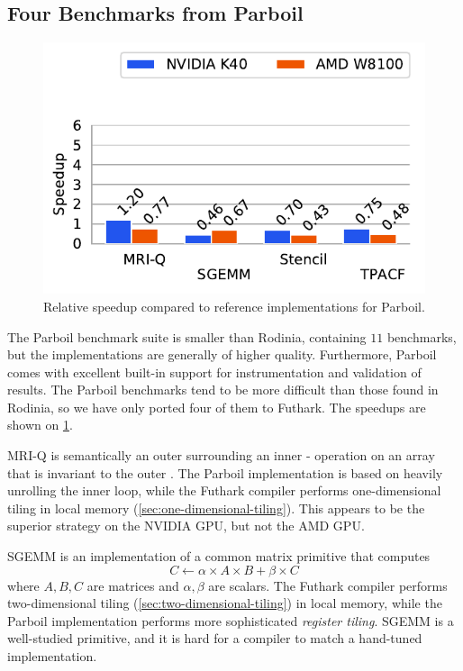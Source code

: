 \subsection{Four Benchmarks from Parboil}

\begin{figure}
  \centering
  \includegraphics[scale=0.65]{experiments/parboil.pdf}
  \caption{Relative speedup compared to reference implementations for Parboil.}
  \label{fig:parboil-speedup}
\end{figure}

The Parboil benchmark suite is smaller than Rodinia, containing $11$
benchmarks, but the implementations are generally of higher quality.
Furthermore, Parboil comes with excellent built-in support for
instrumentation and validation of results.  The Parboil benchmarks
tend to be more difficult than those found in Rodinia, so we have only
ported four of them to Futhark.  The speedups are shown on
\cref{fig:parboil-speedup}.

MRI-Q is semantically an outer  surrounding an inner
- operation on an array that is invariant to the
outer .  The Parboil implementation is based on heavily
unrolling the inner loop, while the Futhark compiler performs
one-dimensional tiling in local memory
(\cref{sec:one-dimensional-tiling}).  This appears to be the superior
strategy on the NVIDIA GPU, but not the AMD GPU.

SGEMM is an implementation of a common matrix primitive that computes
\[
  C \leftarrow \alpha \times A \times B + \beta \times C
\]
where $A,B,C$ are matrices and $\alpha,\beta$ are scalars.  The
Futhark compiler performs two-dimensional tiling
(\cref{sec:two-dimensional-tiling}) in local memory, while the Parboil
implementation performs more sophisticated \textit{register tiling}.
SGEMM is a well-studied primitive, and it is hard for a compiler to
match a hand-tuned implementation.

